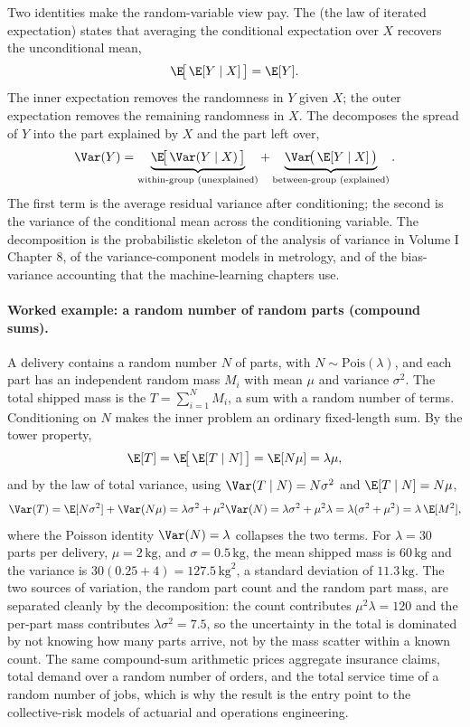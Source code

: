 Two identities make the random-variable view pay. The  (the law of iterated expectation) states that averaging the
conditional expectation over $X$ recovers the unconditional mean,
\[
\E\!\big[\,\E[Y \mid X]\,\big] = \E[Y].
\]
The inner expectation removes the randomness in $Y$ given $X$; the outer
expectation removes the remaining randomness in $X$. The
 decomposes the spread of $Y$ into the
part explained by $X$ and the part left over,
\[
\Var(Y) = \underbrace{\E\!\big[\,\Var(Y \mid X)\,\big]}
_{\text{within-group (unexplained)}}
+ \underbrace{\Var\!\big(\,\E[Y \mid X]\,\big)}
_{\text{between-group (explained)}}.
\]
The first term is the average residual variance after conditioning; the
second is the variance of the conditional mean across the conditioning
variable. The decomposition is the probabilistic skeleton of the
analysis of variance in Volume I Chapter 8, of the variance-component
models in metrology, and of the bias-variance accounting that the
machine-learning chapters use.

\paragraph{Worked example: a random number of random parts (compound
sums).} A delivery contains a random number $N$ of parts, with $N \sim
\mathrm{Pois}(\lambda)$, and each part has an independent random mass
$M_{i}$ with mean $\mu$ and variance $\sigma^{2}$. The total shipped
mass is the  $T = \sum_{i=1}^{N} M_{i}$, a sum with
a random number of terms. Conditioning on $N$ makes the inner problem an
ordinary fixed-length sum. By the tower property,
\[
\E[T] = \E\!\big[\,\E[T \mid N]\,\big] = \E[N\mu] = \lambda\mu,
\]
and by the law of total variance, using $\Var(T \mid N) = N\sigma^{2}$
and $\E[T \mid N] = N\mu$,
\[
\Var(T) = \E[N\sigma^{2}] + \Var(N\mu)
= \lambda\sigma^{2} + \mu^{2}\Var(N)
= \lambda\sigma^{2} + \mu^{2}\lambda
= \lambda(\sigma^{2} + \mu^{2}) = \lambda\,\E[M^{2}],
\]
where the Poisson identity $\Var(N) = \lambda$ collapses the two terms.
For $\lambda = 30$ parts per delivery, $\mu = 2\,\text{kg}$, and
$\sigma = 0.5\,\text{kg}$, the mean shipped mass is $60\,\text{kg}$ and
the variance is $30(0.25 + 4) = 127.5\,\text{kg}^{2}$, a standard
deviation of $11.3\,\text{kg}$. The two sources of variation, the random
part count and the random part mass, are separated cleanly by the
decomposition: the count contributes $\mu^{2}\lambda = 120$ and the
per-part mass contributes $\lambda\sigma^{2} = 7.5$, so the uncertainty
in the total is dominated by not knowing how many parts arrive, not by
the mass scatter within a known count. The same compound-sum arithmetic
prices aggregate insurance claims, total demand over a random number of
orders, and the total service time of a random number of jobs, which is
why the result is the entry point to the collective-risk models of
actuarial and operations engineering.

